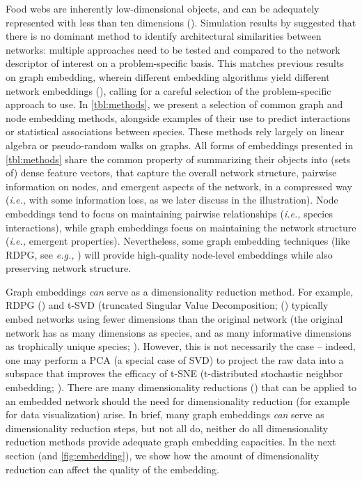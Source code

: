 \begin{refsection}
Food webs are inherently low-dimensional objects, and can be adequately
represented with less than ten dimensions (\cite{Braga2021Phylogenetic,
Eklof2013Dimensionality, Braga2019Spatial}). Simulation results by
\cite{Botella2022Appraisal} suggested that there is no dominant method to
identify architectural similarities between networks: multiple
approaches need to be tested and compared to the network descriptor of
interest on a problem-specific basis. This matches previous results on
graph embedding, wherein different embedding algorithms yield different
network embeddings (\cite{Goyal2018Graph}), calling for a careful
selection of the problem-specific approach to use. In \autoref{tbl:methods}, we
present a selection of common graph and node embedding methods,
alongside examples of their use to predict interactions or statistical
associations between species. These methods rely largely on linear
algebra or pseudo-random walks on graphs. All forms of embeddings
presented in \autoref{tbl:methods} share the common property of summarizing their
objects into (sets of) dense feature vectors, that capture the overall
network structure, pairwise information on nodes, and emergent aspects
of the network, in a compressed way (\emph{i.e.,} with some information
loss, as we later discuss in the illustration). Node embeddings tend to
focus on maintaining pairwise relationships (\emph{i.e.,} species
interactions), while graph embeddings focus on maintaining the network
structure (\emph{i.e.,} emergent properties). Nevertheless, some graph
embedding techniques (like RDPG, see \emph{e.g.,} \cite{Wu2021Maximum}) will
provide high-quality node-level embeddings while also preserving network
structure.

Graph embeddings \emph{can} serve as a dimensionality reduction method.
For example, RDPG (\cite{Strydom2022Food}) and t-SVD (truncated Singular
Value Decomposition; (\cite{Poisot2021ImpMam}) typically embed networks
using fewer dimensions than the original network (the original network
has as many dimensions as species, and as many informative dimensions as
trophically unique species; \cite{Strydom2021SvdEnt}). However, this is not
necessarily the case -- indeed, one may perform a PCA (a special case of
SVD) to project the raw data into a subspace that improves the efficacy
of t-SNE (t-distributed stochastic neighbor embedding;
\cite{Maaten2009Learning}). There are many dimensionality reductions
(\cite{Anowar2021Conceptual}) that can be applied to an embedded network
should the need for dimensionality reduction (for example for data
visualization) arise. In brief, many graph embeddings \emph{can} serve
as dimensionality reduction steps, but not all do, neither do all
dimensionality reduction methods provide adequate graph embedding
capacities. In the next section (and \autoref{fig:embedding}), we show how the
amount of dimensionality reduction can affect the quality of the
embedding.


\end{refsection}
